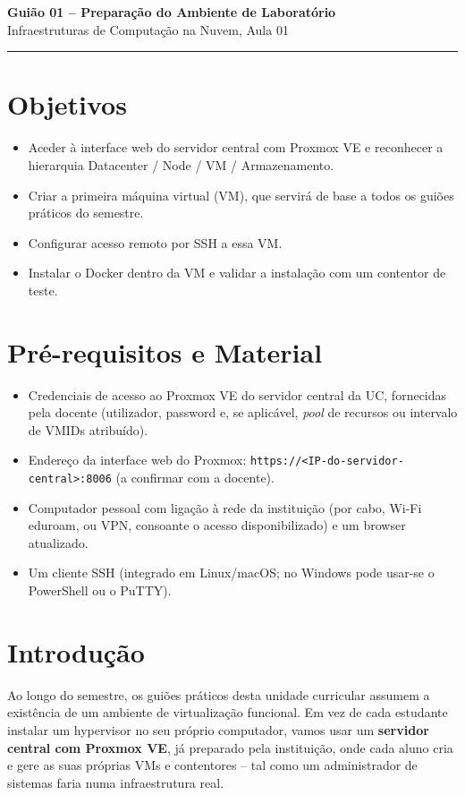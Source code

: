 \documentclass[11pt,a4paper]{article}
\newcommand{\guiaotitle}[2]{%
  \begin{center}
  {\Large\bfseries\color{TextEspresso} #1}\\[0.3cm]
  {\normalsize\color{NudeTaupe} #2}\\[0.2cm]
  {\color{NudeTaupe}\rule{4cm}{0.5pt}}
  \end{center}
  \vspace{0.5cm}
}
\begin{document}
\guiaotitle{Guião 01 -- Preparação do Ambiente de Laboratório}{Infraestruturas de Computação na Nuvem, Aula 01}

\section{Objetivos}
\begin{itemize}[itemsep=0.2cm]
  \item Aceder à interface web do servidor central com Proxmox VE e reconhecer a hierarquia Datacenter / Node / VM / Armazenamento.
  \item Criar a primeira máquina virtual (VM), que servirá de base a todos os guiões práticos do semestre.
  \item Configurar acesso remoto por SSH a essa VM.
  \item Instalar o Docker dentro da VM e validar a instalação com um contentor de teste.
\end{itemize}

\section{Pré-requisitos e Material}
\begin{itemize}[itemsep=0.2cm]
  \item Credenciais de acesso ao Proxmox VE do servidor central da UC, fornecidas pela docente (utilizador, password e, se aplicável, \textit{pool} de recursos ou intervalo de VMIDs atribuído).
  \item Endereço da interface web do Proxmox: \texttt{https://<IP-do-servidor-central>:8006} (a confirmar com a docente).
  \item Computador pessoal com ligação à rede da instituição (por cabo, Wi-Fi eduroam, ou VPN, consoante o acesso disponibilizado) e um browser atualizado.
  \item Um cliente SSH (integrado em Linux/macOS; no Windows pode usar-se o PowerShell ou o PuTTY).
\end{itemize}

\section{Introdução}
Ao longo do semestre, os guiões práticos desta unidade curricular assumem a existência de um ambiente de virtualização funcional. Em vez de cada estudante instalar um hypervisor no seu próprio computador, vamos usar um \textbf{servidor central com Proxmox VE}, já preparado pela instituição, onde cada aluno cria e gere as suas próprias VMs e contentores -- tal como um administrador de sistemas faria numa infraestrutura real.
\end{document}
